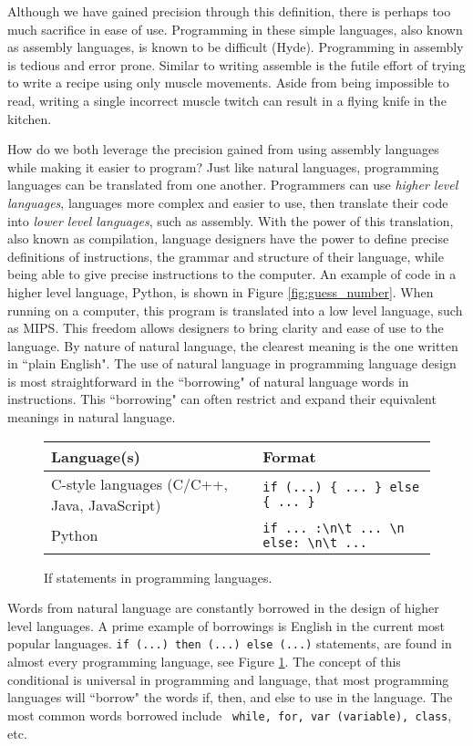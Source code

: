 \documentclass[12pt]{article}
\begin{document}
\begin{flushleft}
Although we have gained precision through this definition, there is
perhaps too much sacrifice in ease of use. Programming in these simple
languages, also known as assembly languages, is known to be difficult (Hyde).
Programming in assembly is tedious and error prone. Similar to writing
assemble is the futile
effort of trying to write a recipe using only muscle movements. Aside from
being impossible to read, writing a single incorrect muscle twitch can
result in a flying knife in the kitchen. \footnotemark

How do we both leverage the precision gained from using assembly
languages while making it easier to program? Just like natural languages,
programming languages can be translated from one another. Programmers
can use \textit{higher level languages}, languages more complex and 
easier to use, then translate their code into \textit{lower level languages},
such as assembly. With the power of this translation,
also known as compilation, language designers
have the power to define precise definitions of instructions, the
grammar and structure of their language, while being able to give
precise instructions to the computer. 
An example of code in a higher level
language, Python, is shown in Figure \ref{fig:guess_number}. When running
on a computer, this program is translated into a low level language, such
as MIPS.
This freedom allows designers to bring clarity and ease of use to
the language. By nature of natural language, the clearest meaning is
the one written in ``plain English". The use of natural language
in programming language design is most straightforward in the ``borrowing" of
natural language words in instructions. This ``borrowing" can often
restrict and expand their equivalent meanings in natural language.

\begin{figure}[h]
\centering
\caption[Caption for LOF]{If statements in programming languages.}
\begin{tabular}{l l}
    Language(s) & Format \\
\hline
    C-style languages (C/C++, Java, JavaScript) &
    \verb|if (...) { ... } else { ... }| \\
    Python & \verb|if ... :\n\t ... \n else: \n\t ...|
\end{tabular}

\label{fig:if_then}
\end{figure}

Words from natural language are constantly borrowed in the design of higher
level languages. A prime example of borrowings is English in the current
most popular languages. \verb|if (...) then (...) else (...)| statements,
are found in almost every programming language, see Figure \ref{fig:if_then}.
The concept of this conditional is universal in programming and language, that
most programming languages will ``borrow" the words if, then, and else to use
in the language. The most common words borrowed include
\verb| while, for, var (variable), class|, etc. \footnotemark


\end{flushleft}
\end{document}
